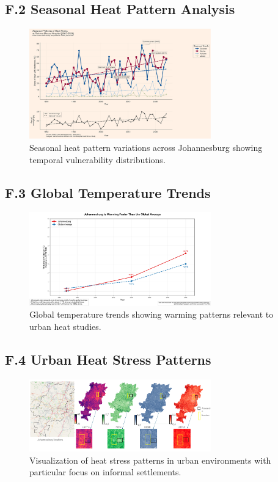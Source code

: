 \graphicspath{{./}{./sections/images/}{./images/}}\documentclass[12pt,a4paper,landscape]{article}
\begin{document}
\subsection*{F.2 Seasonal Heat Pattern Analysis}
\begin{figure}[H]
    \centering
    \includegraphics[width=0.7\textwidth]{sections/images/seasonal_heat_Rahima_1980_2024.png}
    \caption{Seasonal heat pattern variations across Johannesburg showing temporal vulnerability distributions.}
    \label{fig:seasonal}
\end{figure}

\subsection*{F.3 Global Temperature Trends}
\begin{figure}[H]
    \centering
    \includegraphics[width=0.7\textwidth]{sections/images/global_temp_versus_Johannesburg.png}
    \caption{Global temperature trends showing warming patterns relevant to urban heat studies.}
    \label{fig:global_temp}
\end{figure}

\subsection*{F.4 Urban Heat Stress Patterns}
\begin{figure}[H]
    \centering
    \includegraphics[width=0.7\textwidth]{sections/images/heat_stress_LST_NDVI_NDBI_UTFVI_Johannesburg.png}
    \caption{Visualization of heat stress patterns in urban environments with particular focus on informal settlements.}
    \label{fig:heat_stress}
\end{figure}
\end{document}
